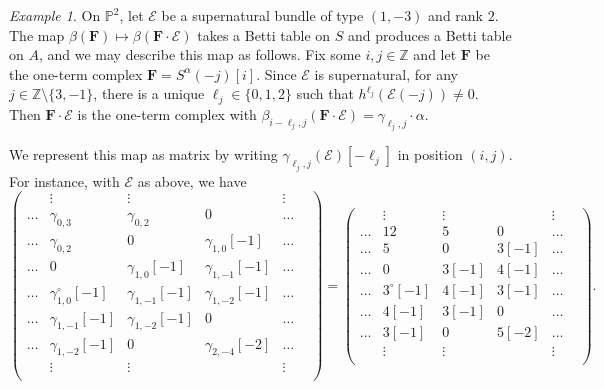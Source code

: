 \documentclass[12pt]{amsart}
\theoremstyle{definition}
\theoremstyle{remark}
\newtheorem{example}[lemma]{Example}
\newcommand{\PP}{\mathbb{P}}
\newcommand{\ZZ}{\mathbb{Z}}
\newcommand{\cE}{\mathcal{E}}
\newcommand{\FF}{\mathbf{F}}
\newcommand{\zp}{\circ}
\begin{document}
\begin{example}\label{ex:sup1}
On $\PP^2$, let $\cE$ be a supernatural bundle of type $(1,-3)$ and rank $2$.  The map $\beta(\FF)\mapsto \beta(\FF\cdot \cE)$ takes a Betti table on $S$ and produces a Betti table on $A$, and we may describe this map as follows.  Fix some $i,j\in \ZZ$ and let $\FF$ be the one-term complex $\FF=S^\alpha(-j)[i]$.  Since $\cE$ is supernatural, for any $j\in \ZZ\setminus \{3,-1\}$, there is a unique $\ell_j\in \{0,1,2\}$ such that $h^{\ell_j}(\cE(-j))\ne 0$.   Then $\FF\cdot \cE$ is the one-term complex with $\beta_{i-\ell_j,j}(\FF\cdot \cE)=\gamma_{\ell_j,j}\cdot \alpha.$

We represent this map as matrix by writing $\gamma_{\ell_j,j}(\cE)[-\ell_j]$ in position $(i,j)$.  For instance, with $\cE$ as above, we have
\[
\begin{pmatrix}
&\vdots&\vdots&&\vdots&\\
\dots&\gamma_{0,3}&\gamma_{0,2}&0&\dots\\
\dots&\gamma_{0,2}&0&\gamma_{1,0}[-1]&\dots\\
\dots&0&\gamma_{1,0}[-1]&\gamma_{1,-1}[-1]&\dots\\
\dots&\gamma_{1,0}^\zp[-1]&\gamma_{1,-1}[-1]&\gamma_{1,-2}[-1]&\dots\\
\dots&\gamma_{1,-1}[-1]&\gamma_{1,-2}[-1]&0&\dots\\
\dots&\gamma_{1,-2}[-1]&0&\gamma_{2,-4}[-2]&\dots\\
&\vdots&\vdots&&\vdots&\\
\end{pmatrix}
=
\begin{pmatrix}
&\vdots&\vdots&&\vdots&\\
\dots&12&5&0&\dots\\
\dots&5&0&3[-1]&\dots\\
\dots&0&3[-1]&4[-1]&\dots\\
\dots&3^\zp[-1]&4[-1]&3[-1]&\dots\\
\dots&4[-1]&3[-1]&0&\dots\\
\dots&3[-1]&0&5[-2]&\dots\\
&\vdots&\vdots&&\vdots&\\
\end{pmatrix}.
\]
\end{example}


\end{document}
